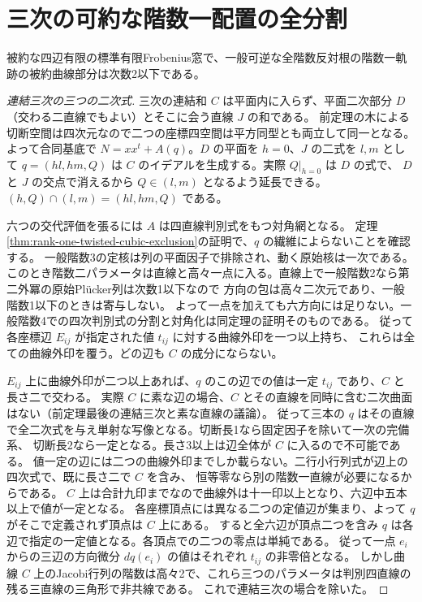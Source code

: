 \section{三次の可約な階数一配置の全分割}
\label{sec:rank-one-cubic-arrangement-exclusion}
\begin{theorem}\label{thm:rank-one-cubic-arrangement-exclusion}
被約な四辺有限の標準有限Frobenius窓で、一般可逆な全階数反対根の階数一軌跡の被約曲線部分は次数2以下である。
\end{theorem}
\begin{proof}[連結三次の三つの二次式]
三次の連結和 $C$ は平面内に入らず、平面二次部分 $D$（交わる二直線でもよい）とそこに会う直線 $J$ の和である。
前定理の木による切断空間は四次元なので二つの座標四空間は平方同型とも両立して同一となる。
よって合同基底で $N=xx^t+A(q)$。$D$ の平面を $h=0$、$J$ の二式を $l,m$ として
$q=(hl,hm,Q)$ は $C$ のイデアルを生成する。実際 $Q|_{h=0}$ は $D$ の式で、
$D$ と $J$ の交点で消えるから $Q\in(l,m)$ となるよう延長できる。$(h,Q)\cap(l,m)=(hl,hm,Q)$ である。

六つの交代評価を張るには $A$ は四直線判別式をもつ対角網となる。
定理\ref{thm:rank-one-twisted-cubic-exclusion}の証明で、$q$ の繊維によらないことを確認する。
一般階数3の定核は列の平面因子で排除され、動く原始核は一次である。
このとき階数二パラメータは直線と高々一点に入る。直線上で一般階数2なら第二外冪の原始Plücker列は次数1以下なので
方向の包は高々二次元であり、一般階数1以下のときは寄与しない。
よって一点を加えても六方向には足りない。一般階数4での四次判別式の分割と対角化は同定理の証明そのものである。
従って各座標辺 $E_{ij}$ が指定された値 $t_{ij}$ に対する曲線外印を一つ以上持ち、
これらは全ての曲線外印を覆う。どの辺も $C$ の成分にならない。

$E_{ij}$ 上に曲線外印が二つ以上あれば、$q$ のこの辺での値は一定 $t_{ij}$ であり、$C$ と長さ二で交わる。
実際 $C$ に素な辺の場合、$C$ とその直線を同時に含む二次曲面はない（前定理最後の連結三次と素な直線の議論）。
従って三本の $q$ はその直線で全二次式を与え単射な写像となる。切断長1なら固定因子を除いて一次の完備系、
切断長2なら一定となる。長さ3以上は辺全体が $C$ に入るので不可能である。
値一定の辺には二つの曲線外印までしか載らない。二行小行列式が辺上の四次式で、既に長さ二で $C$ を含み、
恒等零なら別の階数一直線が必要になるからである。
$C$ 上は合計九印までなので曲線外は十一印以上となり、六辺中五本以上で値が一定となる。
各座標頂点には異なる二つの定値辺が集まり、よって $q$ がそこで定義されず頂点は $C$ 上にある。
すると全六辺が頂点二つを含み $q$ は各辺で指定の一定値となる。各頂点での二つの零点は単純である。
従って一点 $e_i$ からの三辺の方向微分 $dq(e_i)$ の値はそれぞれ $t_{ij}$ の非零倍となる。
しかし曲線 $C$ 上のJacobi行列の階数は高々2で、これら三つのパラメータは判別四直線の残る三直線の三角形で非共線である。
これで連結三次の場合を除いた。
\end{proof}
